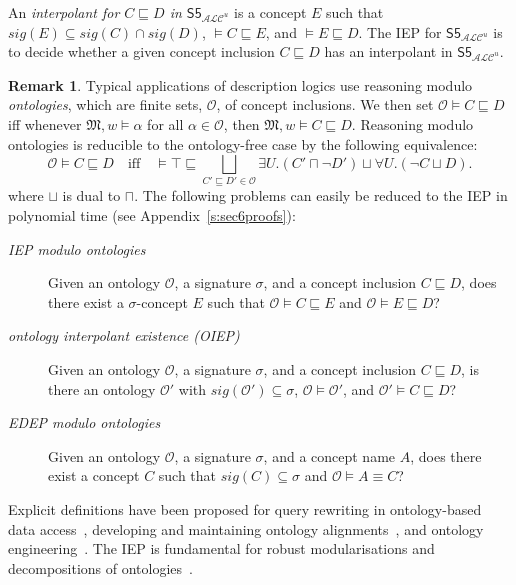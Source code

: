 \documentclass[10pt,a4paper]{amsart}
\theoremstyle{plain}
\theoremstyle{definition}
\newtheorem{rem}[thm]{Remark}
\newcommand{\sig}{\mathit{sig}}
\newcommand{\ALCIOS}{\ensuremath{\mathsf{S5}_{\mathcal{ALC}^u}}}
\begin{document}
An \emph{interpolant for $C \sqsubseteq D$ in $\ALCIOS$} is a concept $E$ such that $\sig(E) \subseteq \sig(C) \cap \sig(D)$, $\models C \sqsubseteq E$, and \mbox{$\models E \sqsubseteq D$}.
%
The IEP for $\ALCIOS$ is to decide whether a given concept inclusion $C \sqsubseteq D$ has an interpolant in $\ALCIOS$.

\begin{rem}\label{rem:dl}
Typical applications of description logics use reasoning modulo \emph{ontologies}, which are finite sets, $\mathcal{O}$, of concept inclusions. We then set $\mathcal{O}\models C\sqsubseteq D$ iff whenever $\mathfrak{M},w\models \alpha$ for all $\alpha \in \mathcal{O}$, then $\mathfrak{M},w\models C \sqsubseteq D$. Reasoning modulo ontologies is reducible to the ontology-free case by the following equivalence:
%
$$
\mathcal{O}\models C \sqsubseteq D \quad \text{iff} \quad
 \models \top \sqsubseteq  \bigsqcup_{C' \sqsubseteq D' \in \mathcal{O}}  \exists U. (C' \sqcap \neg D') \sqcup \forall U.(\neg C \sqcup D). 
$$
%
where $\sqcup$ is dual to $\sqcap$. 
%
The following problems can easily be reduced to the IEP in polynomial time (see Appendix~\ref{s:sec6proofs}): 
%
\begin{description}
\item[\emph{IEP modulo ontologies}] Given an ontology $\mathcal{O}$, a signature $\sigma$, and a concept inclusion $C \sqsubseteq D$, does there exist a $\sigma$-concept $E$ such that $\mathcal{O}\models C \sqsubseteq E$ and $\mathcal{O}\models E \sqsubseteq D$? 
	
\item[\emph{ontology interpolant existence \textup{(}OIEP\textup{)}}] Given an ontology $\mathcal{O}$, a signature $\sigma$, and a concept inclusion $C \sqsubseteq D$, is there an ontology $\mathcal{O}'$ with $\sig(\mathcal{O}') \subseteq \sigma$, $\mathcal{O}\models \mathcal{O}'$, and $\mathcal{O}' \models C \sqsubseteq D$? 
	
\item[\emph{EDEP modulo ontologies}] Given an ontology $\mathcal{O}$, a signature $\sigma$, and a concept name $A$, does there exist a concept $C$ such that $\sig(C)\subseteq \sigma$ and $\mathcal{O}\models A \equiv C$? 
\end{description}
\end{rem}

Explicit definitions have been proposed for query rewriting in ontology-based data access~\cite{FraEtAl13,TomWed21}, developing and maintaining ontology alignments~\cite{DBLP:conf/ekaw/GeletaPT16}, and ontology engineering~\cite{TenEtAl06}. The IEP is fundamental for robust  modularisations and decompositions of ontologies~\cite{DBLP:series/lncs/KonevLWW09,DBLP:conf/rweb/BotoevaKLRWZ16}. 
\end{document}
